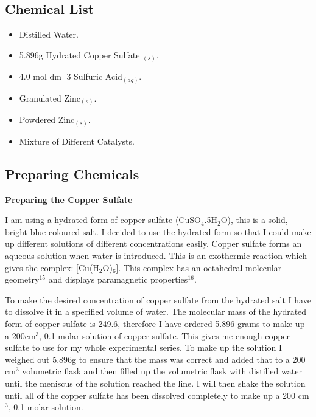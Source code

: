 	\subsection{Chemical List}
\begin{itemize}
\item Distilled Water.
\item 5.896g Hydrated Copper Sulfate ${_(s)}$.
\item 4.0 mol dm$^-3$ Sulfuric Acid${_(aq)}$.
\item Granulated Zinc${_(s)}$.
\item Powdered Zinc${_(s)}$.
\item Mixture of Different Catalysts.
\end{itemize}






	\subsection{Preparing Chemicals} \label{Preparing Chemicals}

\textbf{Preparing the Copper Sulfate}

I am using a hydrated form of copper sulfate (CuSO$_4$.5H$_2$O), this is a solid, bright blue coloured salt. I decided to use the hydrated form so that I could make up different solutions of different concentrations easily. Copper sulfate forms an aqueous solution when water is introduced. This is an exothermic reaction which gives the complex: [Cu(H$_2$O)$_6$]. This complex has an octahedral molecular geometry$^{15}$ and displays paramagnetic properties$^{16}$.

To make the desired concentration of copper sulfate from the hydrated salt I have to dissolve it in a specified volume of water. The molecular mass of the hydrated form of copper sulfate is 249.6, therefore I have ordered 5.896 grams to make up a 200cm$^3$, 0.1 molar solution of copper sulfate. This gives me enough copper sulfate to use for my whole experimental series. To make up the solution I weighed out 5.896g to ensure that the mass was correct and added that to a 200 cm$^3$ volumetric flask and then filled up the volumetric flask with distilled water until the meniscus of the solution reached the line. I will then shake the solution until all of the copper sulfate has been dissolved completely to make up a 200 cm$^3$, 0.1 molar solution.












